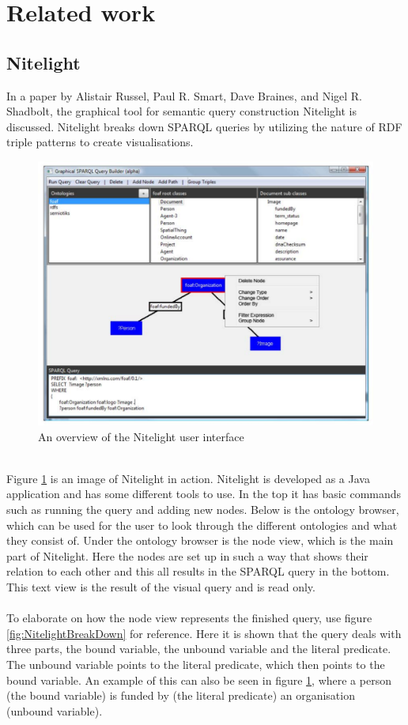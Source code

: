 \section{Related work}
\subsection{Nitelight}
In a paper by Alistair Russel, Paul R. Smart, Dave Braines, and Nigel R. Shadbolt\cite{Nitelight}, the graphical tool for semantic query construction Nitelight is discussed. Nitelight breaks down SPARQL queries  by utilizing the nature of RDF triple patterns to create visualisations. 
\begin{figure}[h]
    \centering
  \includegraphics[width=.9\linewidth]{NitelightFigure1.pdf}
  \caption{An overview of the Nitelight user interface\cite{Nitelight}}
  \label{fig:NitelightUI}
\end{figure}
\\
Figure \ref{fig:NitelightUI} is an image of Nitelight in action. Nitelight is developed as a Java application and has some different tools to use. In the top it has basic commands such as running the query and adding new nodes. Below is the ontology browser, which can be used for the user to look through the different ontologies and what they consist of. Under the ontology browser is the node view, which is the main part of Nitelight. Here the nodes are set up in such a way that shows their relation to each other and this all results in the SPARQL query in the bottom. This text view is the result of the visual query and is read only.
\\\\
To elaborate on how the node view represents the finished query, use figure \ref{fig:NitelightBreakDown} for reference. Here it is shown that the query deals with three parts, the bound variable, the unbound variable and the literal predicate. The unbound variable points to the literal predicate, which then points to the bound variable. An example of this can also be seen in figure \ref{fig:NitelightUI}, where a person (the bound variable) is funded by (the literal predicate) an organisation (unbound variable).

